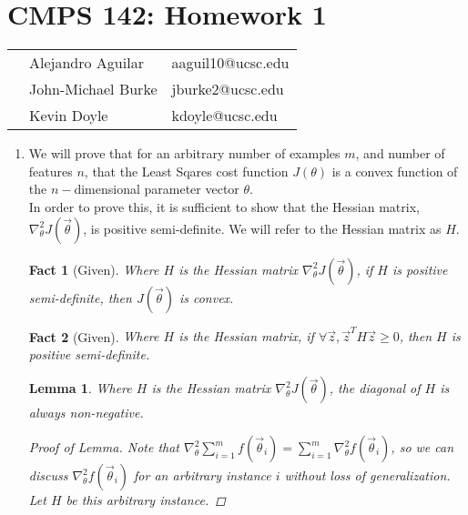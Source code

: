 \documentclass[12pt]{article}
\newtheorem{fact}{Fact}
\newtheorem*{lemma}{Lemma}
\begin{document}
\section*{CMPS 142: Homework 1}

\begin{tabular}{p{8cm} l l}
    & Alejandro Aguilar & aaguil10@ucsc.edu \\
    & John-Michael Burke & jburke2@ucsc.edu\\
    & Kevin Doyle 	& kdoyle@ucsc.edu \\
\end{tabular}
    
\begin{enumerate}
  \item We will prove that for an arbitrary number of examples $m$, and number of features $n$, that the Least Sqares cost function $J(\theta)$ is a convex function of the $n-$dimensional parameter vector $\theta$. \\
  In order to prove this, it is sufficient to show that the Hessian matrix, $\nabla_{\theta}^2 J(\vec{\theta})$, is positive semi-definite. We will refer to the Hessian matrix as $H$.
  
  \begin{fact}[Given]
   Where $H$ is the Hessian matrix $\nabla_{\theta}^2 J(\vec{\theta})$, if $H$ is positive semi-definite, then $J(\vec{\theta})$ is convex.
  \end{fact}
  \begin{fact}[Given]
   Where $H$ is the Hessian matrix, if $\forall \vec{z}, \vec{z}^T H \vec{z} \geq 0$, then $H$ is positive semi-definite.
  \end{fact}
  \begin{lemma}
  Where $H$ is the Hessian matrix $\nabla_{\theta}^2 J(\vec{\theta})$, the diagonal of $H$ is always non-negative. 
  
  	\begin{proof}[Proof of Lemma]
  	Note that $\nabla_{\theta}^2\sum_{i = 1}^{m} f(\vec{\theta}_i) = \sum_{i = 1}^{m}\nabla_{\theta}^2 f(\vec{\theta}_i)$, so we can discuss $\nabla_{\theta}^2 f(\vec{\theta}_i)$ for an arbitrary instance $i$ without loss of generalization. Let $H$ be this arbitrary instance.
  	

\end{proof}
\end{lemma}
\end{enumerate}
\end{document}

